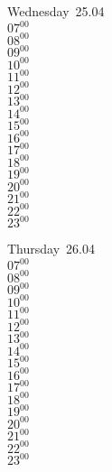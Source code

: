\documentclass[11pt, a4paper]{book}\usepackage[]{graphicx}\usepackage[]{color}
\begin{document}
\begin{weekdaybox}
  Wednesday~25.04\\
  { 
  \vfill
  $07^{00}$\\
$08^{00}$\\
$09^{00}$\\
$10^{00}$\\
$11^{00}$\\
$12^{00}$\\
$13^{00}$\\
$14^{00}$\\
$15^{00}$\\
$16^{00}$\\
$17^{00}$\\
$18^{00}$\\
$19^{00}$\\
$20^{00}$\\
$21^{00}$\\
$22^{00}$\\
$23^{00}$\\
  }
\end{weekdaybox}
\clearpage
\begin{headerbox}
\end{headerbox}
\begin{weekdaybox}
  Thursday~26.04\\
  { 
  \vfill
  $07^{00}$\\
$08^{00}$\\
$09^{00}$\\
$10^{00}$\\
$11^{00}$\\
$12^{00}$\\
$13^{00}$\\
$14^{00}$\\
$15^{00}$\\
$16^{00}$\\
$17^{00}$\\
$18^{00}$\\
$19^{00}$\\
$20^{00}$\\
$21^{00}$\\
$22^{00}$\\
$23^{00}$\\
  }
\end{weekdaybox} 
\end{document}
